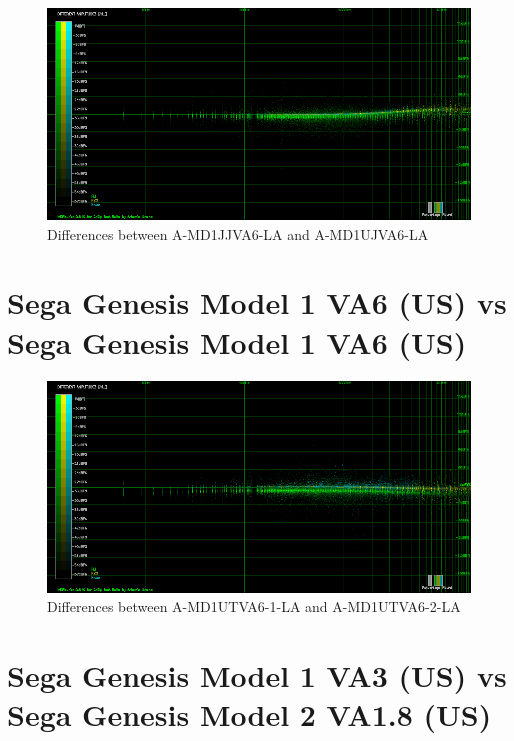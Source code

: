 \documentclass[10pt,a4paper]{report}
\begin{document}
\begin{figure}[H]
	\centering
	\includegraphics[width=1.0\linewidth]{images/results/3-A-MD1JJVA6_LA_vs_A-MD1UJVA6-LA.png}
	\caption[A-MD1JJVA6-LA vs A-MD1UJVA6-LA]{Differences between A-MD1JJVA6-LA and A-MD1UJVA6-LA}
	\label{fig:A-MD1JJVA6_LA_vs_A-MD1UJVA6-LA}
\end{figure}

\section{Sega Genesis Model 1 VA6 (US) vs\\ Sega Genesis Model 1 VA6 (US)}

\begin{figure}[H]
	\centering
	\includegraphics[width=1.0\linewidth]{images/results/4-A-MD1UTVA6-1_LA_vs_A-MD1UTVA6-2_LA.png}
	\caption[A-MD1UTVA6-1-LA vs A-MD1UTVA6-2-LA]{Differences between A-MD1UTVA6-1-LA and A-MD1UTVA6-2-LA}
	\label{fig:A-MD1UTVA6-1_LA_vs_A-MD1UTVA6-2_LA}
\end{figure}

\section{Sega Genesis Model 1 VA3 (US) vs\\ Sega Genesis Model 2 VA1.8 (US)}
\end{document}
